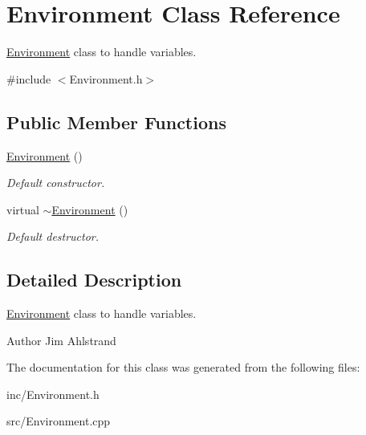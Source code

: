 \hypertarget{classEnvironment}{}\section{Environment Class Reference}
\label{classEnvironment}


\hyperlink{classEnvironment}{Environment} class to handle variables.  




{\ttfamily \#include $<$Environment.\+h$>$}

\subsection*{Public Member Functions}
\begin{DoxyCompactItemize}
\item 
\hypertarget{classEnvironment_a8b427c4448d8b7536666837521b9e83d}{}\hyperlink{classEnvironment_a8b427c4448d8b7536666837521b9e83d}{Environment} ()\label{classEnvironment_a8b427c4448d8b7536666837521b9e83d}

\begin{DoxyCompactList}\small\item\em Default constructor. \end{DoxyCompactList}\item 
\hypertarget{classEnvironment_a8e294735187880dd3d59be10c425b29d}{}virtual \hyperlink{classEnvironment_a8e294735187880dd3d59be10c425b29d}{$\sim$\+Environment} ()\label{classEnvironment_a8e294735187880dd3d59be10c425b29d}

\begin{DoxyCompactList}\small\item\em Default destructor. \end{DoxyCompactList}\end{DoxyCompactItemize}


\subsection{Detailed Description}
\hyperlink{classEnvironment}{Environment} class to handle variables. 

\begin{DoxyAuthor}{Author}
Jim Ahlstrand 
\end{DoxyAuthor}


The documentation for this class was generated from the following files\+:\begin{DoxyCompactItemize}
\item 
inc/Environment.\+h\item 
src/Environment.\+cpp\end{DoxyCompactItemize}
